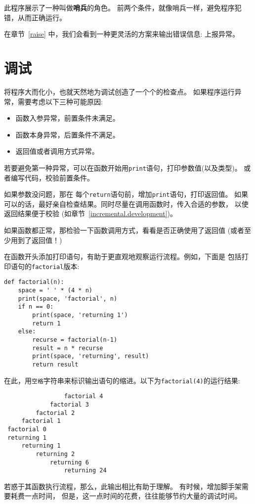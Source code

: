 \documentclass[10pt]{book}
\begin{document}
此程序展示了一种叫做{\bf 哨兵}的角色。
前两个条件，就像哨兵一样，避免程序犯错，从而正确运行。

在章节~\ref{raise} 中，我们会看到一种更灵活的方案来输出错误信息: 上报异常。


\section{调试}
\label{factdebug}
将程序大而化小，也就天然地为调试创造了一个个的检查点。
如果程序运行异常，需要考虑以下三种可能原因:

\begin{itemize}

\item 函数入参异常，前置条件未满足。

\item 函数本身异常，后置条件不满足。

\item 返回值或者调用方式异常。

\end{itemize}

若要避免第一种异常，可以在函数开始用{\tt  print}语句，打印参数值(以及类型)。
或者编写代码，校验前置条件。

如果参数没问题，那在 每个{\tt return}语句前，增加{\tt print}语句，打印返回值。
如果可以的话，最好亲自检查结果。同时尽量在调用函数时，传入合适的参数，
以使返回结果便于校验
(如章节~\ref{incremental.development})。

如果函数都正常，那检验一下函数调用方式，看看是否正确使用了返回值
(或者至少用到了返回值！)

在函数开头添加打印语句，有助于更直观地观察运行流程。例如，下面是
包括打印语句的{\tt factorial}版本:

\begin{verbatim}
def factorial(n):
    space = ' ' * (4 * n)
    print(space, 'factorial', n)
    if n == 0:
        print(space, 'returning 1')
        return 1
    else:
        recurse = factorial(n-1)
        result = n * recurse
        print(space, 'returning', result)
        return result
\end{verbatim}
%
在此，用{\tt 空格}字符串来标识输出语句的缩进。以下为{\tt factorial(4)}的运行结果:

\begin{verbatim}
                 factorial 4
             factorial 3
         factorial 2
     factorial 1
 factorial 0
 returning 1
     returning 1
         returning 2
             returning 6
                 returning 24
\end{verbatim}
%
若惑于其函数执行流程，那么，此输出相比有助于理解。
有时候，增加脚手架需要耗费一点时间，
但是，这一点时间的花费，往往能够节约大量的调试时间。
\end{document}
